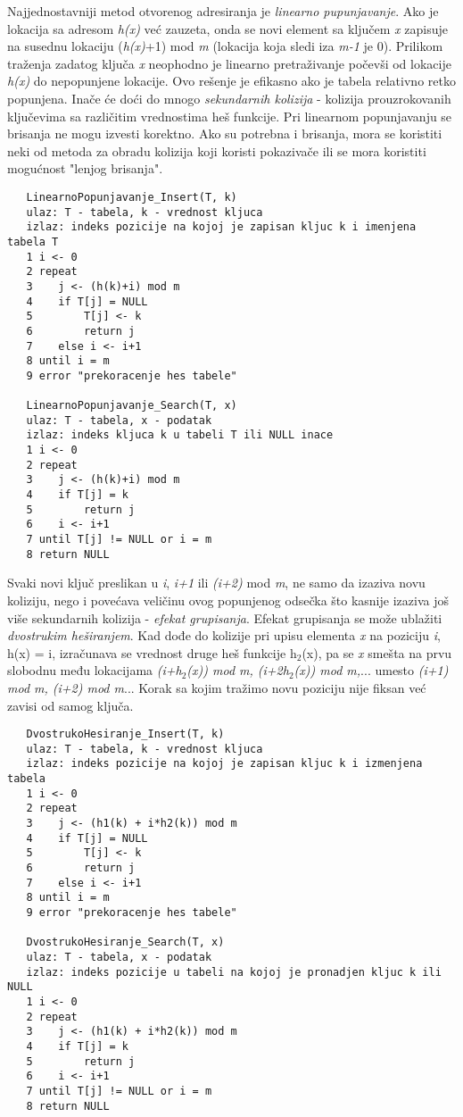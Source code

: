 \documentclass{article}
\begin{document}
\newline
Najjednostavniji metod otvorenog adresiranja je \textit{linearno pupunjavanje}. Ako je lokacija sa adresom \textit{h(x)} već zauzeta, onda se novi element sa ključem \textit{x} zapisuje na susednu lokaciju 
(\textit{h(x)}+1) mod \textit{m} (lokacija koja sledi iza \textit{m-1} je 0). Prilikom traženja zadatog ključa \textit{x} neophodno je linearno pretraživanje počevši od lokacije \textit{h(x)} do nepopunjene lokacije. Ovo rešenje je efikasno ako je tabela relativno retko popunjena. Inače će doći do mnogo \textit{sekundarnih kolizija} - kolizija prouzrokovanih 
ključevima sa različitim vrednostima heš funkcije. Pri linearnom popunjavanju se brisanja ne mogu izvesti korektno. Ako su potrebna i brisanja, mora se koristiti neki od metoda za obradu kolizija koji koristi pokazivače ili se mora koristiti mogućnost "lenjog brisanja".
\begin{lstlisting}
   LinearnoPopunjavanje_Insert(T, k)
   ulaz: T - tabela, k - vrednost kljuca
   izlaz: indeks pozicije na kojoj je zapisan kljuc k i imenjena tabela T
   1 i <- 0
   2 repeat
   3    j <- (h(k)+i) mod m
   4    if T[j] = NULL
   5        T[j] <- k
   6        return j
   7    else i <- i+1
   8 until i = m
   9 error "prekoracenje hes tabele"
   
   LinearnoPopunjavanje_Search(T, x)
   ulaz: T - tabela, x - podatak
   izlaz: indeks kljuca k u tabeli T ili NULL inace
   1 i <- 0
   2 repeat
   3    j <- (h(k)+i) mod m
   4    if T[j] = k 
   5        return j
   6    i <- i+1
   7 until T[j] != NULL or i = m
   8 return NULL
\end{lstlisting}
Svaki novi ključ preslikan u \textit{i}, \textit{i+1} ili \textit{(i+2)} mod \textit{m}, ne samo da izaziva novu koliziju, nego i povećava veličinu ovog popunjenog odsečka što kasnije izaziva još više sekundarnih kolizija - \textit{efekat grupisanja}. Efekat grupisanja se može ublažiti \textit{dvostrukim heširanjem}. Kad dođe do kolizije pri upisu elementa \textit{x} na poziciju \textit{i}, h(x) = i, izračunava se vrednost druge heš funkcije h$_2$(x), pa se \textit{x} smešta na prvu slobodnu među lokacijama \textit{(i+h$_2$(x)) mod m, (i+2h$_2$(x)) mod m,}... umesto \textit{(i+1) mod m, (i+2) mod m}... Korak sa kojim tražimo novu poziciju nije fiksan već zavisi od samog ključa.
\begin{lstlisting}
   DvostrukoHesiranje_Insert(T, k)
   ulaz: T - tabela, k - vrednost kljuca
   izlaz: indeks pozicije na kojoj je zapisan kljuc k i izmenjena tabela
   1 i <- 0
   2 repeat
   3    j <- (h1(k) + i*h2(k)) mod m
   4    if T[j] = NULL
   5        T[j] <- k
   6        return j
   7    else i <- i+1
   8 until i = m
   9 error "prekoracenje hes tabele"
   
   DvostrukoHesiranje_Search(T, x)
   ulaz: T - tabela, x - podatak
   izlaz: indeks pozicije u tabeli na kojoj je pronadjen kljuc k ili NULL
   1 i <- 0
   2 repeat
   3    j <- (h1(k) + i*h2(k)) mod m 
   4    if T[j] = k
   5        return j
   6    i <- i+1
   7 until T[j] != NULL or i = m
   8 return NULL
\end{lstlisting}
\end{document}
